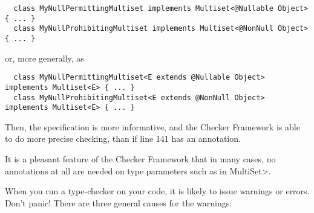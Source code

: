 \begin{Verbatim}
  class MyNullPermittingMultiset implements Multiset<@Nullable Object> { ... }
  class MyNullProhibitingMultiset implements Multiset<@NonNull Object> { ... }
\end{Verbatim}

\noindent
or, more generally, as

\begin{Verbatim}
  class MyNullPermittingMultiset<E extends @Nullable Object> implements Multiset<E> { ... }
  class MyNullProhibitingMultiset<E extends @NonNull Object> implements Multiset<E> { ... }
\end{Verbatim}

Then, the specification is more informative, and the Checker Framework is
able to do more precise checking, than if line 141 has an annotation.

It is a pleasant feature of the Checker Framework that in many cases, no
annotations at all are needed on type parameters such as  in \<MultiSet>.



When you run a type-checker on your code, it is likely to issue warnings or
errors.  Don't panic!  There are three general causes for the warnings:

